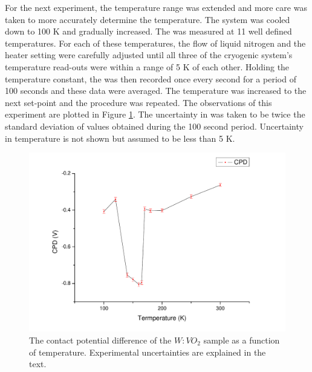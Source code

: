 For the next experiment, the temperature range was extended and more care was taken to more accurately determine the temperature. The system was cooled down to 100 K and gradually increased. The \cpd{} was measured at 11 well defined temperatures. For each of these temperatures, the flow of liquid nitrogen and the heater setting were carefully adjusted until all three of the cryogenic system's temperature read-outs were within a range of 5 K of each other. Holding the temperature constant, the \cpd{} was then recorded once every second for a period of 100 seconds and these data were averaged. The temperature was increased to the next set-point and the procedure was repeated. The observations of this experiment are plotted in Figure \ref{fig:vox2}. The uncertainty in \cpd{} was taken to be twice the standard deviation of \cpd{} values obtained during the 100 second period. Uncertainty in temperature is not shown but assumed to be less than 5 K.\\
\begin{figure}
\centering
	\includegraphics[width=0.8\linewidth]{./figs/vox2}
	\caption{The contact potential difference of the $W:VO_2$ sample as a function of temperature. Experimental uncertainties are explained in the text.}
	\label{fig:vox2}
\end{figure}
